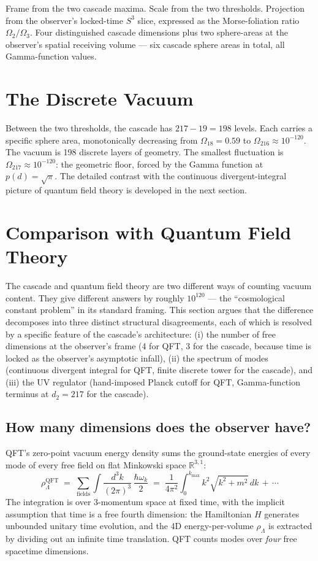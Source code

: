 \documentclass[11pt,a4paper]{article}
\begin{document}
Frame from the two cascade maxima. Scale from the two thresholds.
Projection from the observer's locked-time $S^3$ slice, expressed as
the Morse-foliation ratio $\Omega_2/\Omega_3$. Four distinguished
cascade dimensions plus two sphere-areas at the observer's spatial
receiving volume --- six cascade sphere areas in total, all
Gamma-function values.

\section{The Discrete Vacuum}\label{sec:the-discrete-vacuum}

Between the two thresholds, the cascade has $217 - 19 = 198$ levels. Each
carries a specific sphere area, monotonically decreasing from
$\Omega_{18} = 0.59$ to $\Omega_{216}\approx 10^{-120}$. The vacuum is
198 discrete layers of geometry. The smallest fluctuation is
$\Omega_{217}\approx 10^{-120}$: the geometric floor, forced by the Gamma
function at $p(d) = \sqrt{\pi}$. The detailed contrast with the
continuous divergent-integral picture of quantum field theory is
developed in the next section.

\section{Comparison with Quantum Field Theory}
\label{sec:qft-comparison}

The cascade and quantum field theory are two different ways of counting
vacuum content. They give different answers by roughly $10^{120}$ --- the
``cosmological constant problem'' in its standard framing. This section
argues that the difference decomposes into three distinct structural
disagreements, each of which is resolved by a specific feature of the
cascade's architecture: (i) the number of free dimensions at the
observer's frame (4 for QFT, 3 for the cascade, because time is locked
as the observer's asymptotic infall), (ii) the spectrum of modes
(continuous divergent integral for QFT, finite discrete tower for the
cascade), and (iii) the UV regulator (hand-imposed Planck cutoff for
QFT, Gamma-function terminus at $d_2 = 217$ for the cascade).

\subsection{How many dimensions does the observer have?}

QFT's zero-point vacuum energy density sums the ground-state energies
of every mode of every free field on flat Minkowski space
$\mathbb{R}^{3,1}$:
\begin{equation}\label{eq:qft-vacuum}
\rho_\Lambda^{\mathrm{QFT}} \;=\; \sum_{\text{fields}}\int \frac{d^3k}{(2\pi)^3}\,\frac{\hbar\omega_k}{2}
\;=\; \frac{1}{4\pi^2}\int_0^{k_{\max}} k^2\sqrt{k^2+m^2}\,dk\,+\,\cdots
\end{equation}
The integration is over 3-momentum space at fixed time, with the
implicit assumption that time is a free fourth dimension: the
Hamiltonian $H$ generates unbounded unitary time evolution, and the
4D energy-per-volume $\rho_\Lambda$ is extracted by dividing out an
infinite time translation. QFT counts modes over \emph{four} free
spacetime dimensions.
\end{document}
